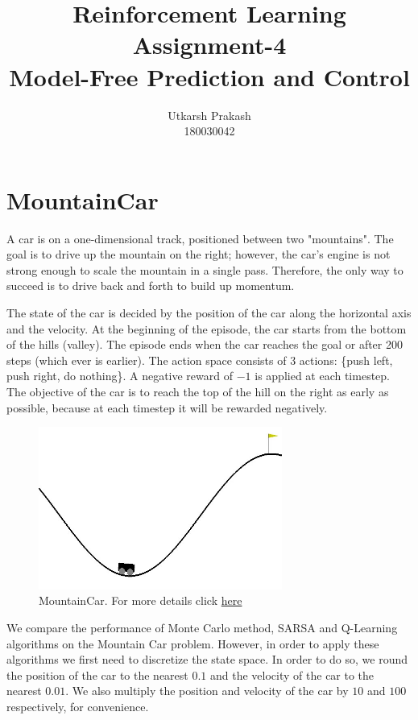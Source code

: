 \documentclass{article}
\title{Reinforcement Learning Assignment-4 \\
	\Large Model-Free Prediction and Control \\}
\begin{document}
\author{Utkarsh Prakash \\ \normalsize 180030042}
\maketitle
\section{MountainCar}
A car is on a one-dimensional track, positioned between two "mountains". The goal is to drive up the mountain on the right; 
however, the car's engine is not strong enough to scale the mountain in a single pass. Therefore, the only way to succeed is to 
drive back and forth to build up momentum. \par

\noindent %
The state of the car is decided by the position of the car along the horizontal axis and the velocity. At the beginning of the
episode, the car starts from the bottom of the hills (valley). The episode ends when the car reaches the goal or after
200 steps (which ever is earlier). The action space consists of 3 actions: \{push left, push right, do nothing\}. A negative reward
of $-1$ is applied at each timestep. The objective of the car is to reach the top of the hill on the right as early as possible, 
because at each timestep it will be rewarded negatively. \par

\begin{figure}[H]
    \graphicspath{ {../tmp/} }
    \begin{center}
    \includegraphics[width=8cm]{mountain_car.jpg}
    \end{center}
    \caption{MountainCar. For more details click \href{https://gym.openai.com/envs/MountainCar-v0/}{here} }
    \label{policy_iter_jack_problem}
\end{figure}

\noindent %
We compare the performance of Monte Carlo method, SARSA and Q-Learning algorithms on the Mountain Car problem. However, in order to
apply these algorithms we first need to discretize the state space. In order to do so, we round the position of the car to the nearest
$0.1$ and the velocity of the car to the nearest $0.01$. We also multiply the position and velocity of the car by $10$ and $100$ 
respectively, for convenience. \par
\end{document}
